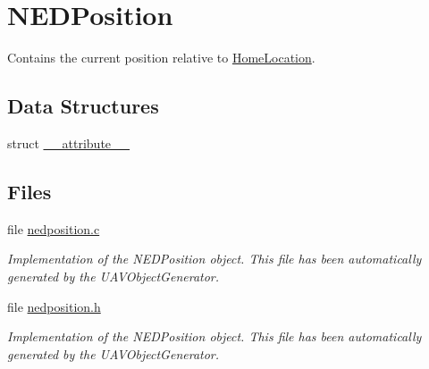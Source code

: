 \hypertarget{group___n_e_d_position}{\section{\-N\-E\-D\-Position}
\label{group___n_e_d_position}
}


\-Contains the current position relative to \hyperlink{group___home_location}{\-Home\-Location}.  


\subsection*{\-Data \-Structures}
\begin{DoxyCompactItemize}
\item 
struct \hyperlink{struct____attribute____}{\-\_\-\-\_\-attribute\-\_\-\-\_\-}
\end{DoxyCompactItemize}
\subsection*{\-Files}
\begin{DoxyCompactItemize}
\item 
file \hyperlink{nedposition_8c}{nedposition.\-c}
\begin{DoxyCompactList}\small\item\em \-Implementation of the \-N\-E\-D\-Position object. \-This file has been automatically generated by the \-U\-A\-V\-Object\-Generator. \end{DoxyCompactList}\item 
file \hyperlink{nedposition_8h}{nedposition.\-h}
\begin{DoxyCompactList}\small\item\em \-Implementation of the \-N\-E\-D\-Position object. \-This file has been automatically generated by the \-U\-A\-V\-Object\-Generator. \end{DoxyCompactList}\end{DoxyCompactItemize}
